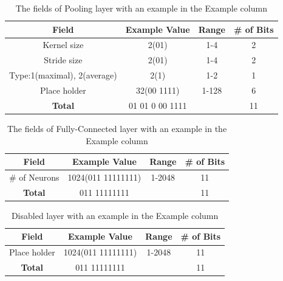 \documentclass[conference]{IEEEtran}
\begin{document}
\begin{table}[!t]
	\renewcommand{\arraystretch}{1.3}
	\caption{The fields of Pooling layer with an example in the Example column}
	\label{table:PoolingFields}
	\centering
	\begin{tabular}{|c|c|c|c|}
		\hline
		Field & Example Value & Range & \# of Bits\\
		\hline
		Kernel size & 2(01) & 1-4 & 2\\
		\hline
		Stride size & 2(01) & 1-4 & 2\\
		\hline
		Type:1(maximal), 2(average) & 2(1) & 1-2 & 1\\
		\hline
		Place holder & 32(00 1111) & 1-128 & 6\\
		\hline
		\textbf{Total} & 01 01 0 00 1111 &  & 11\\
		\hline
	\end{tabular}
\end{table}

\begin{table}[!t]
	\renewcommand{\arraystretch}{1.3}
	\caption{The fields of Fully-Connected layer with an example in the Example column}
	\label{table:FullFields}
	\centering
	\begin{tabular}{|c|c|c|c|}
		\hline
		Field & Example Value & Range & \# of Bits\\
		\hline
		\# of Neurons & 1024(011 11111111) & 1-2048 & 11\\
		\hline
		\textbf{Total} & 011 11111111 &  & 11\\
		\hline
	\end{tabular}
\end{table}

\begin{table}[!t]
	\renewcommand{\arraystretch}{1.3}
	\caption{Disabled layer with an example in the Example column}
	\label{table:DisabledFields}
	\centering
	\begin{tabular}{|c|c|c|c|}
		\hline
		Field & Example Value & Range & \# of Bits\\
		\hline
		Place holder & 1024(011 11111111) & 1-2048 & 11\\
		\hline
		\textbf{Total} & 011 11111111 &  & 11\\
		\hline
	\end{tabular}
\end{table}
\end{document}
